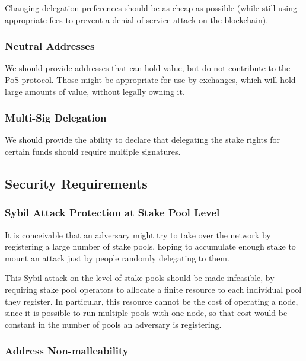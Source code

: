 \documentclass[11pt,a4paper]{article}
\begin{document}
Changing delegation preferences should be as cheap as possible (while
still using appropriate fees to prevent a denial of service attack on
the blockchain).

\subsubsection{Neutral Addresses}
\label{neutral-addresses}

We should provide addresses that can hold value, but do not contribute
to the PoS protocol. Those might be appropriate for use by exchanges,
which will hold large amounts of value, without legally owning it.

\subsubsection{Multi-Sig Delegation}
\label{multi-sig-delegation}

We should provide the ability to declare that delegating the stake rights for
certain funds should require multiple signatures.

\subsection{Security Requirements}
\label{security-requirements}

\subsubsection{Sybil Attack Protection at Stake Pool Level}
\label{sybil-attack-protection-at-stake-pool-level}

It is conceivable that an adversary might try to take over the
network by registering a large number of stake pools, hoping to
accumulate enough stake to mount an attack just by people randomly
delegating to them.

This Sybil attack on the level of stake pools should be made infeasible,
by requiring stake pool operators to allocate a finite resource to each
individual pool they register. In particular, this resource cannot be
the cost of operating a node, since it is possible to run multiple pools
with one node, so that cost would be constant in the number of pools an
adversary is registering.

\subsubsection{Address Non-malleability}
\label{address-nonmalleability}
\end{document}
